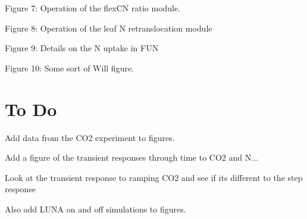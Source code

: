 \documentclass[draft,linenumbers]{agujournal}
\begin{document}
Figure 7: Operation of the flexCN ratio module.

Figure 8: Operation of the leaf N retranslocation module

Figure 9: Details on the N uptake in FUN

Figure 10: Some sort of Will figure.

\section{To Do}
Add data from the CO2 experiment to figures.

Add a figure of the transient responses through time to CO2 and N... 

Look at the transient response to ramping CO2 and see if its different to the step response

Also add LUNA on and off simulations to figures.


\nocite{*}


\end{document}
